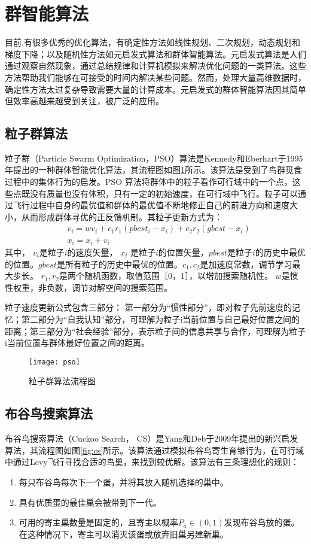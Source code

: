 \section{群智能算法}
目前,有很多优秀的优化算法，有确定性方法如线性规划、二次规划，动态规划和梯度下降；以及随机性方法如元启发式算法和群体智能算法。元启发式算法是人们通过观察自然现象，通过总结规律和计算机模拟来解决优化问题的一类算法。这些方法帮助我们能够在可接受的时间内解决某些问题。然而，处理大量高维数据时，确定性方法太过复杂导致需要大量的计算成本。元启发式的群体智能算法因其简单但效率高越来越受到关注，被广泛的应用。

  \subsection{粒子群算法}
  粒子群（Particle Swarm Optimization，PSO）算法是Kennedy和Eberhart于1995年提出的一种群体智能优化算法，其流程图如图\ref{fig:pso}所示。该算法是受到了鸟群觅食过程中的集体行为的启发。PSO 算法将群体中的粒子看作可行域中的一个点，这些点既没有质量也没有体积，只有一定的初始速度，在可行域中飞行。粒子可以通过飞行过程中自身的最优值和群体的最优值不断地修正自己的前进方向和速度大小，从而形成群体寻优的正反馈机制。其粒子更新方式为：
  \begin{align}
    &v_i= wv_i +c_1r_1(pbest_i-x_i )+c_2r_2(gbest-x_i )\\
    &x_{i} = x_i+v_i 
  \end{align}
  其中， $v_i$是粒子$i$的速度矢量， $x_i$ 是粒子$i$的位置矢量，$pbest$是粒子$i$的历史中最优的位置。$gbest$是所有粒子的历史中最优的位置。$c_1,c_2$是加速度常数，调节学习最大步长。 $r_1,r_2$是两个随机函数，取值范围［0，1］，以增加搜索随机性。 $w$是惯性权重，非负数，调节对解空间的搜索范围。

  粒子速度更新公式包含三部分： 第一部分为“惯性部分”，即对粒子先前速度的记忆；第二部分为“自我认知”部分，可理解为粒子i当前位置与自己最好位置之间的距离；第三部分为“社会经验”部分，表示粒子间的信息共享与合作，可理解为粒子i当前位置与群体最好位置之间的距离。
  \begin{figure}[htbp]
    \centering
    \texttt{[image: pso]}
    \caption{粒子群算法流程图}
    \label{fig:pso}
  \end{figure}

  \subsection{布谷鸟搜索算法}
    布谷鸟搜索算法（Cuckoo Search， CS）是Yang和Deb于2009年提出的新兴启发算法，其流程图如图\ref{fig:cs}所示。该算法通过模拟布谷鸟寄生育雏行为，在可行域中通过Levy飞行寻找合适的鸟巢，来找到较优解。该算法有三条理想化的规则：
    \begin{enumerate}
      \item {每只布谷鸟每次下一个蛋，并将其放入随机选择的巢中。}
      \item {具有优质蛋的最佳巢会被带到下一代。}
      \item {可用的寄主巢数量是固定的，且寄主以概率$P_a\in(0,1)$发现布谷鸟放的蛋。在这种情况下，寄主可以消灭该蛋或放弃旧巢另建新巢。}
    \end{enumerate}

